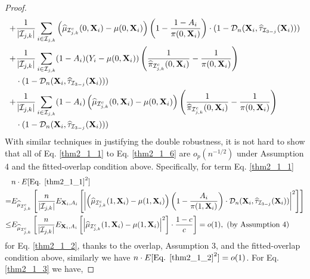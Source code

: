 \documentclass[11pt]{article}
\theoremstyle{referenceplain}
\theoremstyle{referencedefinition}
\theoremstyle{referenceremark}
\begin{document}
\begin{proof}
\begin{align}
        +&\frac{1}{|\mathcal{I}_{j,k}|}\sum_{i\in\mathcal{I}_{j,k}}\left(\widehat{\mu}_{\mathcal{I}_{j,k}^c}(0,\mathbf{X}_i)-\mu(0,\mathbf{X}_i)\right)\left(1-\frac{1-A_i}{\pi(0,\mathbf{X}_i)}\right)\cdot (1-\mathcal{D}_n(\mathbf{X}_i,\widehat{\tau}_{\mathcal{I}_{3-j}}(\mathbf{X}_i)))\label{thm2_1_4}\\
        +&\frac{1}{|\mathcal{I}_{j,k}|}\sum_{i\in\mathcal{I}_{j,k}} (1-A_i) (Y_i-\mu(0,\mathbf{X}_i))\left(\frac{1}{\widehat{\pi}_{\mathcal{I}_{j,k}^c}(0,\mathbf{X}_i)}-\frac{1}{\pi(0,\mathbf{X}_i)}\right)\notag\\
        &\cdot (1-\mathcal{D}_n(\mathbf{X}_i,\widehat{\tau}_{\mathcal{I}_{3-j}}(\mathbf{X}_i)))\label{thm2_1_5}\\
        +&\frac{1}{|\mathcal{I}_{j,k}|}\sum_{i\in\mathcal{I}_{j,k}} (1-A_i) \left(\widehat{\mu}_{\mathcal{I}_{j,k}^c}(0,\mathbf{X}_i)-\mu(0,\mathbf{X}_i)\right)\left(\frac{1}{\widehat{\pi}_{\mathcal{I}_{j,k}^c}(0,\mathbf{X}_i)}-\frac{1}{\pi(0,\mathbf{X}_i)}\right)\notag\\
        &\cdot (1-\mathcal{D}_n(\mathbf{X}_i,\widehat{\tau}_{\mathcal{I}_{3-j}}(\mathbf{X}_i)))\label{thm2_1_6}
    \end{align}
   With similar techniques in justifying the double robustness, it is not hard to show that all of Eq. \eqref{thm2_1_1} to Eq. \eqref{thm2_1_6} are $o_p(n^{-1/2})$ under Assumption 4 {and the fitted-overlap condition above}. Specifically, for term Eq. \eqref{thm2_1_1}
    \begin{align*}
        &n\cdot E[\text{Eq. }\eqref{thm2_1_1}^2]\\
        =&E_{\widehat{\mu}_{\mathcal{I}_{j,k}^c}}\left[ \frac{n}{|\mathcal{I}_{j,k}|}E_{\mathbf{X}_i,A_i}\left[\left|\left(\widehat{\mu}_{\mathcal{I}_{j,k}^c}(1,\mathbf{X}_i)-\mu(1,\mathbf{X}_i)\right)\left(1-\frac{A_i}{\pi(1,\mathbf{X}_i)}\right)\cdot \mathcal{D}_n(\mathbf{X}_i,\widehat{\tau}_{\mathcal{I}_{3-j}}(\mathbf{X}_i))\right|^2\right]\right]\\
        \leq & E_{\widehat{\mu}_{\mathcal{I}_{j,k}^c}}\left[ \frac{n}{|\mathcal{I}_{j,k}|}E_{\mathbf{X}_i,A_i}\left[\left|\widehat{\mu}_{\mathcal{I}_{j,k}^c}(1,\mathbf{X}_i)-\mu(1,\mathbf{X}_i)\right|^2\right]\cdot\frac{
        1-c
        }{c}\right]=o(1), \text{ (by Assumption 4)}
    \end{align*}
    for Eq. \eqref{thm2_1_2}, thanks to the overlap, Assumption 3, {and the fitted-overlap condition above,} similarly we have $ n\cdot E[\text{Eq. }\eqref{thm2_1_2}^2]=o(1)$.
    For Eq. \eqref{thm2_1_3} we have,

\end{proof}
\end{document}
